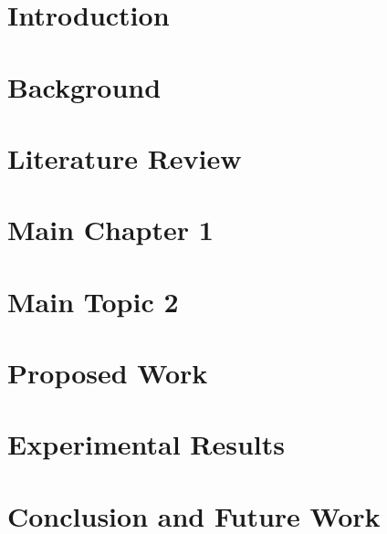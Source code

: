 \documentclass[12pt]{report}
\begin{document}










\tableofcontents

\cleardoublepage
{}
\listoffigures

\cleardoublepage
{}
\listoftables

\lstlistoflistings

\cleardoublepage
\chapter{ Introduction} \label{ch:intro}


\chapter{ Background} \label{ch:background}


\chapter{Literature Review} \label{ch:literature_review}



\chapter{Main Chapter 1} \label{ch:main_chapter1}


\chapter{Main Topic 2} \label{ch:main_chapter2}


\chapter{Proposed Work} \label{ch:proposal}


\chapter{Experimental Results} \label{ch:experimental_results}


\chapter{Conclusion and Future Work} \label{ch:conclusion}



\printbibliography
\end{document}
